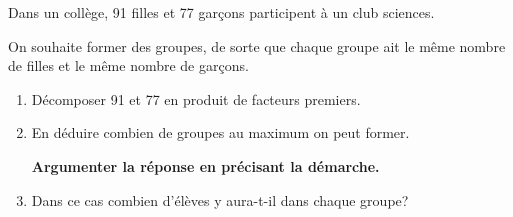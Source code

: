 \medskip

Dans un collège, 91 filles et 77 garçons participent à un club sciences.

On souhaite former des groupes, de sorte que chaque groupe ait le même nombre de filles et le même nombre de garçons.

\medskip

\begin{enumerate}
\item Décomposer 91 et 77 en produit de facteurs premiers.
\item En déduire combien de groupes au maximum on peut former.

\textbf{Argumenter la réponse en précisant la démarche.}
\item Dans ce cas combien d'élèves y aura-t-il dans chaque groupe?
\end{enumerate}
